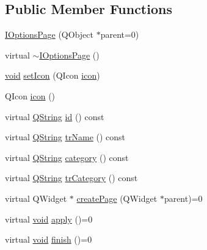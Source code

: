\subsection*{\-Public \-Member \-Functions}
\begin{DoxyCompactItemize}
\item 
\hyperlink{group___core_plugin_ga9b695b2de67229131dbe91bd1ef22ef8}{\-I\-Options\-Page} (\-Q\-Object $\ast$parent=0)
\item 
virtual \hyperlink{group___core_plugin_gaaea80acd4f4df67edf6a8027abf6b016}{$\sim$\-I\-Options\-Page} ()
\item 
\hyperlink{group___u_a_v_objects_plugin_ga444cf2ff3f0ecbe028adce838d373f5c}{void} \hyperlink{group___core_plugin_gaab16eddf8ad1ee26863b41acaf18feb3}{set\-Icon} (\-Q\-Icon \hyperlink{group___core_plugin_gac858e7a1ee4af77f311dba0b44d22d4d}{icon})
\item 
\-Q\-Icon \hyperlink{group___core_plugin_gac858e7a1ee4af77f311dba0b44d22d4d}{icon} ()
\item 
virtual \hyperlink{group___u_a_v_objects_plugin_gab9d252f49c333c94a72f97ce3105a32d}{\-Q\-String} \hyperlink{group___core_plugin_ga2984fb6ab0e3b502783dfee7ba596268}{id} () const 
\item 
virtual \hyperlink{group___u_a_v_objects_plugin_gab9d252f49c333c94a72f97ce3105a32d}{\-Q\-String} \hyperlink{group___core_plugin_ga9bda94026b37720a30f4294560c79244}{tr\-Name} () const 
\item 
virtual \hyperlink{group___u_a_v_objects_plugin_gab9d252f49c333c94a72f97ce3105a32d}{\-Q\-String} \hyperlink{group___core_plugin_ga03767437394cdfbfc9e253638a71b132}{category} () const 
\item 
virtual \hyperlink{group___u_a_v_objects_plugin_gab9d252f49c333c94a72f97ce3105a32d}{\-Q\-String} \hyperlink{group___core_plugin_gac5538fc040c826784167edb4fc359b68}{tr\-Category} () const 
\item 
virtual \-Q\-Widget $\ast$ \hyperlink{group___core_plugin_gac70a4473b3e086d0fa9849c431fb0672}{create\-Page} (\-Q\-Widget $\ast$parent)=0
\item 
virtual \hyperlink{group___u_a_v_objects_plugin_ga444cf2ff3f0ecbe028adce838d373f5c}{void} \hyperlink{group___core_plugin_ga05fa0c9b91da02a0f2fed11d2d6afed0}{apply} ()=0
\item 
virtual \hyperlink{group___u_a_v_objects_plugin_ga444cf2ff3f0ecbe028adce838d373f5c}{void} \hyperlink{group___core_plugin_ga47cf2602b6ee72a4971b1f0a4e1d887e}{finish} ()=0
\end{DoxyCompactItemize}


